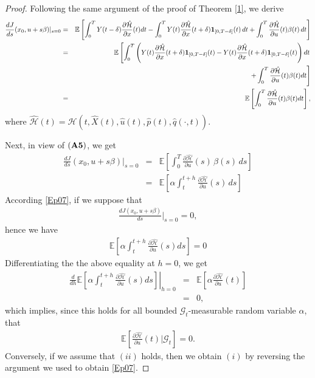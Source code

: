 \documentclass[10pt,a4paper]{amsart}
\def\E{\mathbb E}
\begin{document}
\begin{proof}
Following the same argument of the proof of Theorem \ref{1}, we derive
\begin{eqnarray*}
\frac{dJ}{ds}(x_0,u+s\beta)|_{s=0}&=&	\E \left[ 
	\int_{0}^{T} Y(t-\delta)\frac{\partial \hat{\mathcal{H}}}{\partial x}(t)dt -\int_{0}^{T} Y(t)\frac{\partial \hat{\mathcal{H}}}{\partial x}(t+\delta)\mathbf{1}_{[0,T-\delta]}(t) \, dt + \int_{0}^{T} \frac{\partial \hat{\mathcal{H}}}{\partial u}(t) \beta(t)  \,dt 
	\right]\\
	&=& \E\left[\int_{0}^{T}\left(Y(t)\frac{\partial \hat{\mathcal{H}}}{\partial x}(t+\delta){\bf1}_{[0,T-\delta]}(t) - Y(t)\frac{\partial \hat{\mathcal{H}}}{\partial x}(t+\delta)\mathbf{1}_{[0,T-\delta]}(t) \right)dt\right.\\
	&&\left.+ \int_{0}^{T} \frac{\partial \hat{\mathcal{H}}}{\partial u}(t) \beta(t) dt\right]\\ 
	&=& \E\left[\int_{0}^{T} \frac{\partial \hat{\mathcal{H}}}{\partial u}(t) \beta(t) dt\right],
\end{eqnarray*}
where $\hat{\mathcal{H}}(t)=\mathcal{H}\left(t,\hat{X}(t), \hat{u}(t), \hat{p}(t), \hat{q}(\cdot,t) \right)$.

Next, in view of $({\bf A5})$, we get
\begin{eqnarray}\label{Ep07}
\frac{dJ}{ds}(x_0,u+s\beta)|_{s=0} 
&=& \mathbb{E}\left[ \int_0^T \frac{\partial \hat{\mathcal{H}}}{\partial u}(s)\, \beta(s)\, ds \right] \nonumber\\
&=& \mathbb{E} \left[ \alpha \int_t^{t+h} \frac{\partial \hat{\mathcal{H}}}{\partial u}(s)\, ds\right]
\end{eqnarray}
According \eqref{Ep07}, if we suppose that
\begin{eqnarray}\label{Ep08}
\frac{dJ(x_0,u+s\beta)}{ds}|_{s=0} = 0,
\end{eqnarray}
hence we have 
\begin{eqnarray*}
\mathbb{E} \left[ \alpha \int_t^{t+h} \frac{\partial \hat{\mathcal{H}}}{\partial u}(s)ds\right]=0
\end{eqnarray*}
Differentiating the the above equality at $h=0$, we get
\begin{eqnarray*}
\left.\frac{d}{dh}\mathbb{E}\left[\alpha \int_{t}^{t+h}\frac{\partial \hat{\mathcal{H}}}{\partial u}(s)ds\right]\right|_{h=0}&=&
\mathbb{E}\left[\alpha \frac{\partial \hat{\mathcal{H}}}{\partial u}(t)\right]\\
&=&0,
\end{eqnarray*}
which implies, since this holds for all bounded $\mathcal{G}_t$-measurable random variable $\alpha$, that
\begin{eqnarray*}
\mathbb{E}\left[\frac{\partial \hat{\mathcal{H}}}{\partial u}(t)|\mathcal{G}_t \right] = 0.
\end{eqnarray*}
Conversely, if we assume that $(ii)$ holds, then we obtain $(i)$ by reversing the argument we used to obtain \eqref{Ep07}.
\end{proof}
\end{document}
